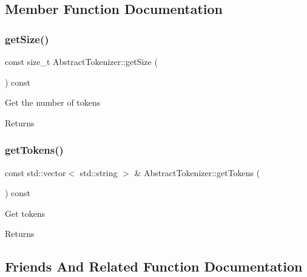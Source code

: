\subsection{Member Function Documentation}
\mbox{\label{classAbstractTokenizer_ab1f0ec877a204abe9338f290e515e7d7}} 
\subsubsection{\texorpdfstring{get\+Size()}{getSize()}}
{\footnotesize\ttfamily const size\+\_\+t Abstract\+Tokenizer\+::get\+Size (\begin{DoxyParamCaption}{ }\end{DoxyParamCaption}) const}

Get the number of tokens \begin{DoxyReturn}{Returns}

\end{DoxyReturn}
\mbox{\label{classAbstractTokenizer_a1c23c57444bf8356347f1ae113034d1b}} 
\subsubsection{\texorpdfstring{get\+Tokens()}{getTokens()}}
{\footnotesize\ttfamily const std\+::vector$<$ std\+::string $>$ \& Abstract\+Tokenizer\+::get\+Tokens (\begin{DoxyParamCaption}{ }\end{DoxyParamCaption}) const}

Get tokens \begin{DoxyReturn}{Returns}

\end{DoxyReturn}


\subsection{Friends And Related Function Documentation}
\mbox{\label{classAbstractTokenizer_afe537fa967b2a1d1db799e201b4007fa}} 
